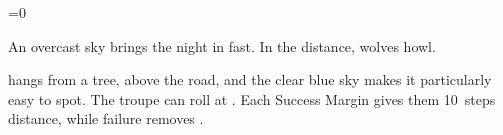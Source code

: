\ifnum\value{cycle}=0


\begin{boxtext}
  An overcast sky brings the night in fast.
  In the distance, wolves howl.
\end{boxtext}

 hangs from a tree, above the road, and the clear blue sky makes it particularly easy to spot.
The troupe can roll  at \tn[10].
Each Success Margin gives them 10~\glspl{step} distance, while failure removes .

\woodspy

\fi

